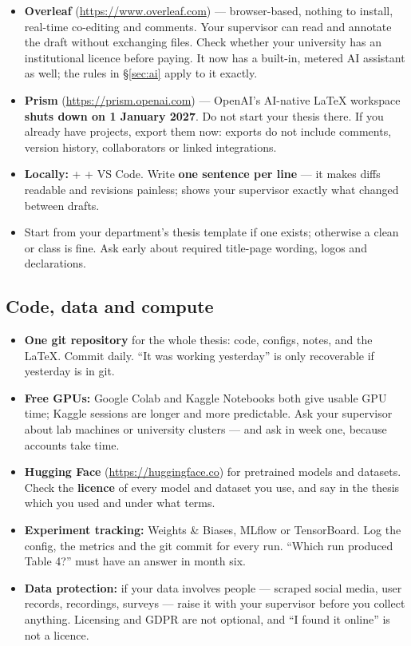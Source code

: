 \documentclass[11pt,a4paper]{article}
\begin{document}
\begin{itemize}
  \item \textbf{Overleaf} (\url{https://www.overleaf.com}) --- browser-based,
        nothing to install, real-time co-editing and comments. Your supervisor
        can read and annotate the draft without exchanging files. Check whether
        your university has an institutional licence before paying. It now has
        a built-in, metered AI assistant as well; the rules in \S\ref{sec:ai}
        apply to it exactly.
  \item \textbf{Prism} (\url{https://prism.openai.com}) --- OpenAI's
        AI-native LaTeX workspace \textbf{shuts down on 1 January 2027}. Do
        not start your thesis there. If you already have projects, export them
        now: exports do not include comments, version history, collaborators
        or linked integrations.
  \item \textbf{Locally:}  +  + VS Code.
        Write \textbf{one sentence per line} --- it makes diffs readable and
        revisions painless;  shows your supervisor exactly
        what changed between drafts.
  \item Start from your department's thesis template if one exists; otherwise
        a clean  or  class is fine. Ask early about
        required title-page wording, logos and declarations.
\end{itemize}

\subsection{Code, data and compute}

\begin{itemize}
  \item \textbf{One git repository} for the whole thesis: code, configs,
        notes, and the LaTeX. Commit daily. ``It was working yesterday'' is
        only recoverable if yesterday is in git.
  \item \textbf{Free GPUs:} Google Colab and Kaggle Notebooks both give usable
        GPU time; Kaggle sessions are longer and more predictable. Ask your
        supervisor about lab machines or university clusters --- and ask in
        week one, because accounts take time.
  \item \textbf{Hugging Face} (\url{https://huggingface.co}) for pretrained
        models and datasets. Check the \textbf{licence} of every model and
        dataset you use, and say in the thesis which you used and under what
        terms.
  \item \textbf{Experiment tracking:} Weights \& Biases, MLflow or
        TensorBoard. Log the config, the metrics and the git commit for every
        run. ``Which run produced Table 4?'' must have an answer in month six.
  \item \textbf{Data protection:} if your data involves people --- scraped
        social media, user records, recordings, surveys --- raise it with your
        supervisor before you collect anything. Licensing and GDPR are not
        optional, and ``I found it online'' is not a licence.
\end{itemize}
\end{document}
